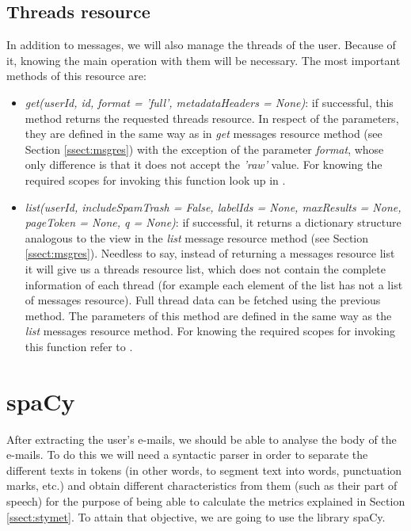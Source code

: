 \subsection{Threads resource}\label{ssect:threads}
In addition to messages, we will also manage the threads of the user. Because of it, knowing the main operation with them will be necessary. The most important methods of this resource are:
\begin{itemize}
	\item\textit{get(userId, id, format = 'full', metadataHeaders = None)}: if successful, this method returns the requested threads resource. In respect of the parameters, they are defined in the same way as in \textit{get} messages resource method (see Section \ref{ssect:msgres}) with the exception of the parameter \textit{format}, whose only difference is that it does not accept the \textit{'raw'} value. For knowing the required scopes for invoking this function look up in \cite[/v1/reference/users/threads/get]{gmailAPI}.
	\item\textit{list(userId, includeSpamTrash = False, labelIds = None, maxResults = None, pageToken = None, q = None)}: if successful, it returns a dictionary structure analogous to the view in the \textit{list} message resource method (see Section \ref{ssect:msgres}). Needless to say, instead of returning a messages resource list it will give us a threads resource list, which does not contain the complete information of each thread (for example each element of the list has not a list of messages resource). Full thread data can be fetched using the previous method. The parameters of this method are defined in the same way as the \textit{list} messages resource method. For knowing the required scopes for invoking this function refer to \cite[/v1/reference/users/threads/list]{gmailAPI}.
\end{itemize}

\section{spaCy}\label{sect:spacy}
After extracting the user's e-mails, we should be able to analyse the body of the e-mails. To do this we will need a syntactic parser in order to separate the different texts in tokens (in other words, to segment text into words, punctuation marks, etc.) and obtain different characteristics from them (such as their part of speech) for the purpose of being able to calculate the metrics explained in Section \ref{ssect:stymet}. To attain that objective, we are going to use the library spaCy.

